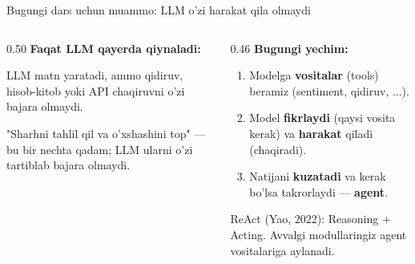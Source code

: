 \documentclass[aspectratio=169,11pt]{beamer}
\begin{document}
\begin{frame}{Bugungi dars uchun muammo: LLM o'zi harakat qila olmaydi}
  \begin{columns}[T]
    \begin{column}{0.50\textwidth}
      \textbf{Faqat LLM qayerda qiynaladi:}\\[3pt]
      \small
      \begin{tcolorbox}[warnbox,title={Tashqi dunyoga ta'sir yo'q},top=2pt,bottom=2pt]
        \footnotesize
        LLM matn yaratadi, ammo qidiruv, hisob-kitob yoki API chaqiruvni o'zi
        bajara olmaydi.
      \end{tcolorbox}
      \vspace{3pt}
      \begin{tcolorbox}[warnbox,title={Ko'p qadamli reja yo'q},top=2pt,bottom=2pt]
        \footnotesize
        "Sharhni tahlil qil va o'xshashini top" --- bu bir nechta qadam; LLM
        ularni o'zi tartiblab bajara olmaydi.
      \end{tcolorbox}
    \end{column}
    \begin{column}{0.46\textwidth}
      \textbf{Bugungi yechim:}\\[4pt]
      \small
      \begin{enumerate}\setlength\itemsep{4pt}
        \item Modelga \textbf{vositalar} (tools) beramiz (sentiment, qidiruv, ...).
        \item Model \textbf{fikrlaydi} (qaysi vosita kerak) va \textbf{harakat}
              qiladi (chaqiradi).
        \item Natijani \textbf{kuzatadi} va kerak bo'lsa takrorlaydi --- \textbf{agent}.
      \end{enumerate}
      \vspace{5pt}
      \begin{tcolorbox}[okbox,top=2pt,bottom=2pt]
        \footnotesize
        ReAct (Yao, 2022): Reasoning $+$ Acting. Avvalgi modullaringiz agent
        vositalariga aylanadi.
      \end{tcolorbox}
    \end{column}
  \end{columns}
\end{frame}

\end{document}
